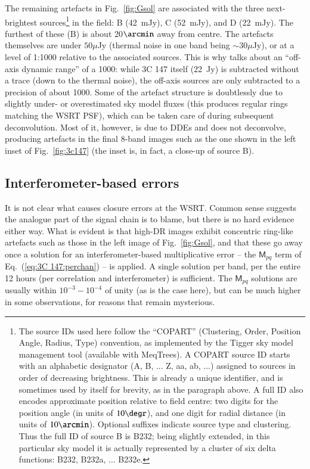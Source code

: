 \documentclass{aa}
\newcommand{\coh}[2]{\mathsf{{#1}}_{{#2}}}
\begin{document}
The remaining artefacts in Fig.~\ref{fig:Gsol} are associated with the three next-brightest sources\footnote{The source IDs used here follow the ``COPART'' (Clustering, Order, Position Angle, Radius, Type) convention, as implemented by the Tigger sky model management tool (available with MeqTrees). A COPART source ID starts with an alphabetic designator (A, B, ... Z, aa, ab, ...) assigned to sources in order of decreasing brightness. This is already a unique identifier, and is sometimes used by itself for brevity, as in the paragraph above. A full ID also encodes approximate position relative to field centre: two digits for the position angle (in units of $10\degr$), and one digit for radial distance (in units of $10\arcmin$). Optional suffixes indicate source type and clustering. Thus the full ID of source B is B232; being slightly extended, in this particular sky model it is actually represented by a cluster of six delta functions: B232, B232a, ... B232e.} in 
the field: B (42~mJy), C (52~mJy), and D (22~mJy). The furthest of these (B) is about 20$\arcmin$ away from centre. The artefacts themselves are under $50 \mu$Jy (thermal noise in one band being $\sim 30 \mu$Jy), or at a level of 1:1000 relative to the associated sources. This is why \citet{deBruyn:million} talks about an ``off-axis dynamic range'' of a 1000: while 3C 147 itself (22~Jy) is subtracted without a trace (down to the thermal noise), the off-axis sources are only subtracted to a precision of about 1000. Some of the artefact structure is doubtlessly due to slightly under- or overestimated sky model fluxes (this produces regular rings matching the WSRT PSF), which can be taken care of during subsequent deconvolution. Most of it, however, is due to DDEs and does not deconvolve, producing artefacts in the final 8-band images such as the one shown in the left inset of Fig.~\ref{fig:3c147} (the inset is, in fact, a close-up of source B).

\subsection{Interferometer-based errors\label{sec:3C 147:closure-errors}}

It is not clear what causes closure errors at the WSRT. Common sense suggests the analogue part of the signal chain is to blame, but there is no hard evidence either way. What is evident is that high-DR images exhibit concentric ring-like artefacts such as those in the left image of Fig.~\ref{fig:Gsol}, and that these go away once a solution for an interferometer-based  multiplicative error -- the $\coh{M}{pq}$ term of Eq.~(\ref{eq:3C 147:perchan}) -- is applied. A single solution per band, per the entire 12 hours (per correlation and interferometer) is sufficient. The $\coh{M}{pq}$ solutions are usually within $10^{-3}-10^{-4}$ of unity (as is the case here), but can be much higher in some observations, for reasons that remain mysterious. 
\end{document}
